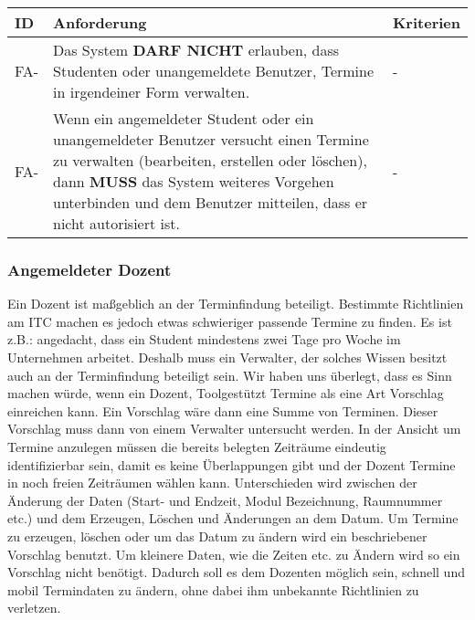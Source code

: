 \begin{tabular} {|p{}|p{11cm}|p{}|}
	\hline
	ID & Anforderung & Kriterien \\
	\hline
	FA-
	& Das System \textbf{DARF NICHT} erlauben, dass Studenten oder unangemeldete Benutzer, Termine in irgendeiner Form verwalten. 
	& - \\
	\hline
	FA-
	& Wenn ein angemeldeter Student oder ein unangemeldeter Benutzer versucht einen Termine zu verwalten (bearbeiten, erstellen oder löschen), dann \textbf{MUSS} das System weiteres Vorgehen unterbinden und dem Benutzer mitteilen, dass er nicht autorisiert ist.
	& - \\ 
	\hline
\end{tabular}

\newpage

\subsubsection{Angemeldeter Dozent}
Ein Dozent ist maßgeblich an der Terminfindung beteiligt. Bestimmte Richtlinien am ITC machen es jedoch etwas schwieriger passende Termine zu finden. Es ist z.B.: angedacht, dass ein Student mindestens zwei Tage pro Woche im Unternehmen arbeitet. Deshalb muss ein Verwalter, der solches Wissen besitzt auch an der Terminfindung beteiligt sein. Wir haben uns überlegt, dass es Sinn machen würde, wenn ein Dozent, Toolgestützt Termine als eine Art Vorschlag einreichen kann. Ein Vorschlag wäre dann eine Summe von Terminen. Dieser Vorschlag muss dann von einem Verwalter untersucht werden. In der Ansicht um Termine anzulegen müssen die bereits belegten Zeiträume eindeutig identifizierbar sein, damit es keine Überlappungen gibt und der Dozent Termine in noch freien Zeiträumen wählen kann. Unterschieden wird zwischen der Änderung der Daten (Start- und Endzeit, Modul Bezeichnung, Raumnummer etc.) und dem Erzeugen, Löschen und Änderungen an dem Datum. Um Termine zu erzeugen, löschen oder um das Datum zu ändern wird ein beschriebener Vorschlag benutzt. Um kleinere Daten, wie die Zeiten etc. zu Ändern wird so ein Vorschlag nicht benötigt. Dadurch soll es dem Dozenten möglich sein, schnell und mobil Termindaten zu ändern, ohne dabei ihm unbekannte Richtlinien zu verletzen.

\vspace{12pt}

